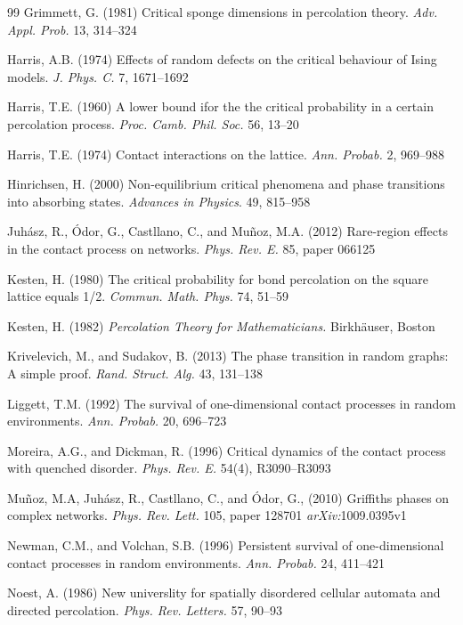 \documentclass[11pt]{article}
\theoremstyle{definition}
\begin{document}
\begin{thebibliography}{99}
Grimmett, G. (1981)
Critical sponge dimensions in percolation theory.
{\it Adv. Appl. Prob.} 13, 314--324

Harris, A.B. (1974) 
Effects of random defects on the critical behaviour of Ising models.
{\it J. Phys. C.} 7, 1671--1692



Harris, T.E. (1960)
A lower bound ifor the the critical probability in a certain percolation process.
{\it Proc. Camb. Phil. Soc.} 56, 13--20


Harris, T.E. (1974) 
Contact interactions on the lattice.
{\it Ann. Probab.} 2, 969--988

Hinrichsen, H. (2000)
Non-equilibrium critical phenomena and phase transitions into absorbing states. {\it Advances in Physics}. 49, 815–958

Juh\'asz, R., \'Odor, G., Castllano, C., and Mu\~noz, M.A. (2012)
Rare-region effects in the contact process on networks.
{\it Phys. Rev. E.} 85, paper 066125

Kesten, H. (1980)
The critical probability for bond percolation on the square lattice equals 1/2.
{\it Commun. Math. Phys.} 74, 51--59

Kesten, H. (1982)
{\it Percolation Theory for Mathematicians.}
Birkh\"auser, Boston



Krivelevich, M., and Sudakov, B. (2013)
The phase transition in random graphs: A simple proof.
{\it Rand. Struct. Alg.} 43, 131--138

Liggett, T.M. (1992)
The survival of one-dimensional contact processes in random environments.
{\it Ann. Probab.} 20, 696--723


Moreira, A.G., and Dickman, R. (1996)
Critical dynamics of the contact process with quenched disorder.
{\it Phys. Rev. E.} 54(4), R3090--R3093


 Mu\~noz, M.A, Juh\'asz, R.,  Castllano, C., and \'Odor, G., (2010)
Griffiths phases on complex networks.
{\it Phys. Rev. Lett.} 105, paper 128701
{\it arXiv:}1009.0395v1 

Newman, C.M., and Volchan, S.B. (1996)
Persistent survival of one-dimensional contact processes in random environments.
{\it Ann. Probab.} 24, 411--421

Noest, A. (1986)
New universlity for spatially disordered cellular automata and directed percolation.
{\it Phys. Rev. Letters.} 57, 90--93



\end{thebibliography}
\end{document}
